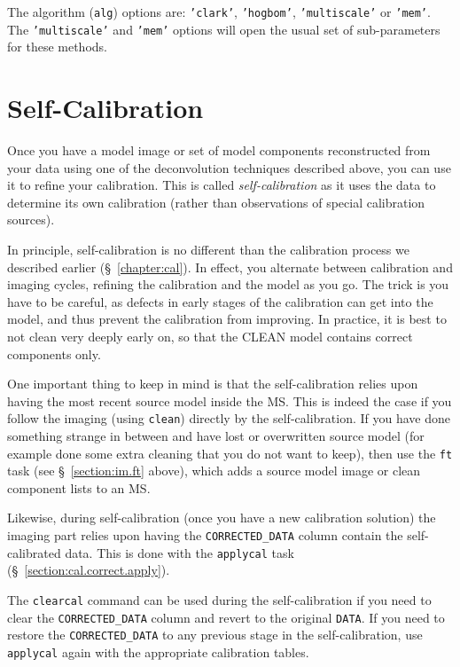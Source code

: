 The algorithm ({\tt alg}) options are: {\tt 'clark'}, {\tt 'hogbom'}, 
{\tt 'multiscale'} or {\tt 'mem'}.  The {\tt 'multiscale'} and
{\tt 'mem'} options will open the usual set of sub-parameters for these
methods.

\section{Self-Calibration}
\label{section:im.selfcal}

Once you have a model image or set of model components reconstructed
from your data using one of the deconvolution techniques described
above, you can use it to refine your calibration.  This is called
{\it self-calibration} as it uses the data to determine its own
calibration (rather than observations of special calibration sources).

In principle, self-calibration is no different than the calibration
process we described earlier (\S~\ref{chapter:cal}).  In effect, you
alternate between calibration and imaging cycles, refining the calibration
and the model as you go.  The trick is you have to be careful, as defects
in early stages of the calibration can get into the model, and thus
prevent the calibration from improving.  In practice, it is best to
not clean very deeply early on, so that the CLEAN model contains
correct components only.  

One important thing to keep in mind is that the self-calibration
relies upon having the most recent source model inside the MS.  This is indeed
the case if you follow the imaging (using {\tt clean})
directly by the self-calibration.  If you have done something strange
in between and have lost or overwritten source model
(for example done some extra cleaning that you do not want to keep),
then use the {\tt ft} task (see \S~\ref{section:im.ft} above), which 
adds a source model image or clean component lists to an MS.  

Likewise, during self-calibration (once you have a new calibration
solution) the imaging part
relies upon having the {\tt CORRECTED\_DATA} column contain
the self-calibrated data.  This is done with the {\tt applycal}
task (\S~\ref{section:cal.correct.apply}).  

The {\tt clearcal} command can be used during the self-calibration if
you need to clear the {\tt CORRECTED\_DATA} column and revert to the
original {\tt DATA}.  If you need to restore the {\tt CORRECTED\_DATA}
to any previous stage in the self-calibration, use {\tt applycal}
again with the appropriate calibration tables.

